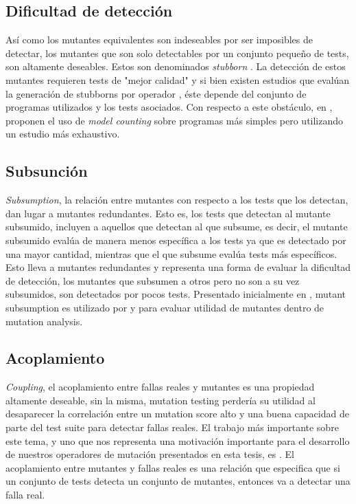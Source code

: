 \subsection{Dificultad de detecci\'on}

As\'i como los mutantes equivalentes son indeseables por ser imposibles de detectar, los mutantes que son solo detectables por un conjunto peque\~no de tests, son altamente deseables. Estos son denominados \emph{stubborn} \cite{bibliography.mutation.evaluation.stubbornHieronsHD99}. La detecci\'on de estos mutantes requieren tests de "mejor calidad" y si bien existen estudios que eval\'uan la generaci\'on de stubborns por operador \cite{bibliography.mutation.evaluation.stubborn}, \'este depende del conjunto de programas utilizados y los tests asociados. Con respecto a este obst\'aculo, en \cite{bibliography.mutation.evaluation.hardnessVisser}, proponen el uso de \emph{model counting} sobre programas m\'as simples pero utilizando un estudio m\'as exhaustivo.

\subsection{Subsunci\'on}

\emph{Subsumption}, la relaci\'on entre mutantes con respecto a los tests que los detectan, dan lugar a mutantes redundantes. Esto es, los tests que detectan al mutante subsumido, incluyen a aquellos que detectan al que subsume, es decir, el mutante subsumido eval\'ua de manera menos espec\'ifica a los tests ya que es detectado por una mayor cantidad, mientras que el que subsume eval\'ua tests m\'as espec\'ificos. Esto lleva a mutantes redundantes y representa una forma de evaluar la dificultad de detecci\'on, los mutantes que subsumen a otros pero no son a su vez subsumidos, son detectados por pocos tests. Presentado inicialmente en \cite{bibliography.mutation.selection.Offutt96}, mutant subsumption es utilizado por \cite{bibliography.mutation.minimizing.dynamicsubsumption} y \cite{bibliography.mutation.evaluation.JustKA17} para evaluar utilidad de mutantes dentro de mutation analysis.

\subsection{Acoplamiento}

\emph{Coupling}, el acoplamiento entre fallas reales y mutantes es una propiedad altamente deseable, sin la misma, mutation testing perder\'ia su utilidad al desaparecer la correlaci\'on entre un mutation score alto y una buena capacidad de parte del test suite para detectar fallas reales. El trabajo m\'as importante sobre este tema, y uno que nos representa una motivaci\'on importante para el desarrollo de nuestros operadores de mutaci\'on presentados en esta tesis, es \cite{bibliography.mutation.evaluation.valid-substitute}. El acoplamiento entre mutantes y fallas reales es una relaci\'on que especifica que si un conjunto de tests detecta un conjunto de mutantes, entonces va a detectar una falla real. 


